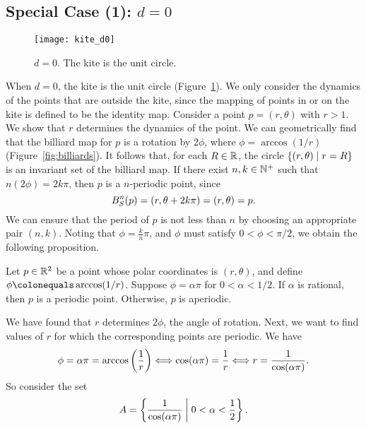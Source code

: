 \documentclass[10pt,twoside,draft]{book}
\begin{document}
\subsection*{Special Case (1): $d = 0$}
\begin{figure}[ht]
  \begin{center}
    \texttt{[image: kite\_d0]}
    \caption{$d = 0$. The kite is the unit circle.}
    \label{fig:kite-circle}
  \end{center}
\end{figure}
When $d = 0$, the kite is the unit circle (Figure~\ref{fig:kite-circle}).
We only consider the dynamics of the points that are outside the kite, since the mapping of points in or on the kite is defined to be the identity map.
Consider a point $p = (r, \theta)$ with $r > 1$.
We show that $r$ determines the dynamics of the point.
We can geometrically find that the billiard map for $p$ is a rotation by $2\phi$, where $\phi = \arccos(1/r)$ (Figure~\ref{fig:billiards}).
It follows that, for each $R \in \mathbb{R}$, the circle $\left \{ (r,\theta) \mathrel{} \middle| \mathrel{} r = R \right \}$ is an invariant set of the billiard map.
If there exist $n, k \in \mathbb{N}^+$ such that $n(2\phi) = 2k\pi$, then $p$ is a $n$-periodic point, since 
\begin{equation*}
  B_S^{n}(p) = (r, \theta + 2k\pi) = (r, \theta) = p.
\end{equation*}
We can ensure that the period of $p$ is not less than $n$ by choosing an appropriate pair $(n,k)$.
Noting that $\phi = \frac{k}{n}\pi$, and $\phi$ must satisfy $0 < \phi < \pi/2$, we obtain the following proposition.
\begin{proposition}
  Let $p \in \mathbb{R}^2$ be a point whose polar coordinates is $(r,\theta)$, and define $\phi \ceq \arccos(1/r)$.
  Suppose $\phi = \alpha\pi$ for $0 < \alpha < 1/2$.
  If $\alpha$ is rational, then $p$ is a periodic point.
  Otherwise, $p$ is aperiodic.
\end{proposition}
We have found that $r$ determines $2\phi$, the angle of rotation.
Next, we want to find values of $r$ for which the corresponding points are periodic.
We have
\begin{equation*}
  \phi = \alpha\pi = \arccos\left (  \frac{1}{r}  \right ) 
  \Longleftrightarrow \cos(\alpha\pi) = \frac{1}{r}
  \Longleftrightarrow r = \frac{1}{\cos(\alpha\pi)}.
\end{equation*}
So consider the set
\begin{equation*}
  A = \left \{ \frac{1}{\cos(\alpha\pi)} \mathrel{} \middle| \mathrel{} 0 < \alpha < \frac{1}{2} \right \}.
\end{equation*}
\end{document}
